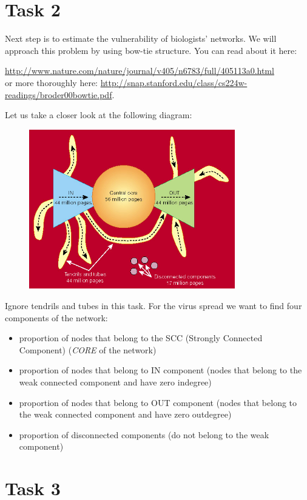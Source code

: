 \documentclass{article}
\begin{document}
\section*{Task 2}
Next step is to estimate the vulnerability of biologists' networks. We will approach this problem by using bow-tie structure. You can read about it here: 

\url{http://www.nature.com/nature/journal/v405/n6783/full/405113a0.html} \\or more thoroughly here: \url{http://snap.stanford.edu/class/cs224w-readings/broder00bowtie.pdf}.

Let us take a closer look at the following diagram:
\begin{figure}[H]
\centering
    \includegraphics[width=0.8\textwidth]{bowtie}
\end{figure}
Ignore tendrils and tubes in this task. For the virus spread we want to find four components of the network:

\begin{itemize}
\item proportion of nodes that belong to the SCC (Strongly Connected Component) (\emph{CORE} of the network) 
\item proportion of nodes that belong to IN component (nodes that belong to the weak connected component and have zero indegree)
\item proportion of nodes that belong to OUT component (nodes that belong to the weak connected component and have zero outdegree)
\item proportion of disconnected components (do not belong to the weak component)   
\end{itemize}
\section*{Task 3}
\end{document}
